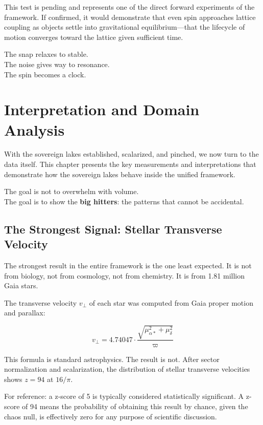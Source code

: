 \documentclass[11pt, letterpaper, openany]{book}
\begin{document}
This test is pending and represents one of the direct forward experiments of the framework.
If confirmed, it would demonstrate that even spin approaches lattice coupling as objects
settle into gravitational equilibrium---that the lifecycle of motion converges toward the lattice
given sufficient time.

The snap relaxes to stable.\\
The noise gives way to resonance.\\
The spin becomes a clock.

\chapter{Interpretation and Domain Analysis}

With the sovereign lakes established, scalarized, and pinched, we now turn to the data itself.
This chapter presents the key measurements and interpretations that demonstrate how the
sovereign lakes behave inside the unified framework.

The goal is not to overwhelm with volume.\\
The goal is to show the \textbf{big hitters}: the patterns that cannot be accidental.

\section*{The Strongest Signal: Stellar Transverse Velocity}

The strongest result in the entire framework is the one least expected. It is not from biology,
not from cosmology, not from chemistry. It is from 1.81 million Gaia stars.

The transverse velocity $v_\perp$ of each star was computed from Gaia proper motion and
parallax:

\[
v_\perp = 4.74047 \cdot \frac{\sqrt{\mu_{\alpha*}^2 + \mu_\delta^2}}{\varpi}
\]

This formula is standard astrophysics. The result is not. After sector normalization and
scalarization, the distribution of stellar transverse velocities shows $z = 94$ at $16/\pi$.

For reference: a z-score of 5 is typically considered statistically significant. A z-score of
94 means the probability of obtaining this result by chance, given the chaos null, is
effectively zero for any purpose of scientific discussion.
\end{document}
